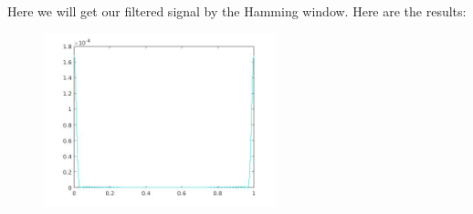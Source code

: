 \documentclass[a4paper,11pt]{article}
\begin{document}
Here we will get our filtered signal by the Hamming window. Here are the results:

\begin{figure}[!hp]
    \begin{center}
      \includegraphics[width=0.6\textwidth]{images/lab2_33.jpg}
    \end{center}
\end{figure}

\newpage
\end{document}
